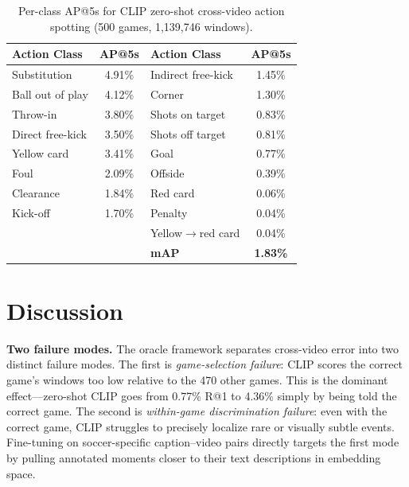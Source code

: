 \documentclass[10pt,twocolumn]{article}
\begin{document}
\begin{table}[tp]
  \centering
  \caption{Per-class AP@5s for CLIP zero-shot cross-video action spotting (500 games, 1,139,746 windows).}
  \label{tab:per-class}
  \small
  \begin{tabular}{lc@{\hspace{2em}}lc}
    \toprule
    Action Class & AP@5s & Action Class & AP@5s \\
    \midrule
    Substitution          & 4.91\% & Indirect free-kick  & 1.45\% \\
    Ball out of play      & 4.12\% & Corner              & 1.30\% \\
    Throw-in              & 3.80\% & Shots on target     & 0.83\% \\
    Direct free-kick      & 3.50\% & Shots off target    & 0.81\% \\
    Yellow card           & 3.41\% & Goal                & 0.77\% \\
    Foul                  & 2.09\% & Offside             & 0.39\% \\
    Clearance             & 1.84\% & Red card            & 0.06\% \\
    Kick-off              & 1.70\% & Penalty             & 0.04\% \\
                          &        & Yellow$\to$red card & 0.04\% \\
    \midrule
    \multicolumn{2}{l}{}  & \textbf{mAP} & \textbf{1.83\%} \\
    \bottomrule
  \end{tabular}
\end{table}


\section{Discussion}

\noindent\textbf{Two failure modes.}
The oracle framework separates cross-video error into two distinct failure modes. The first is \emph{game-selection failure}: CLIP scores the correct game's windows too low relative to the 470 other games. This is the dominant effect---zero-shot CLIP goes from 0.77\% R@1 to 4.36\% simply by being told the correct game. The second is \emph{within-game discrimination failure}: even with the correct game, CLIP struggles to precisely localize rare or visually subtle events. Fine-tuning on soccer-specific caption--video pairs directly targets the first mode by pulling annotated moments closer to their text descriptions in embedding space.
\end{document}
